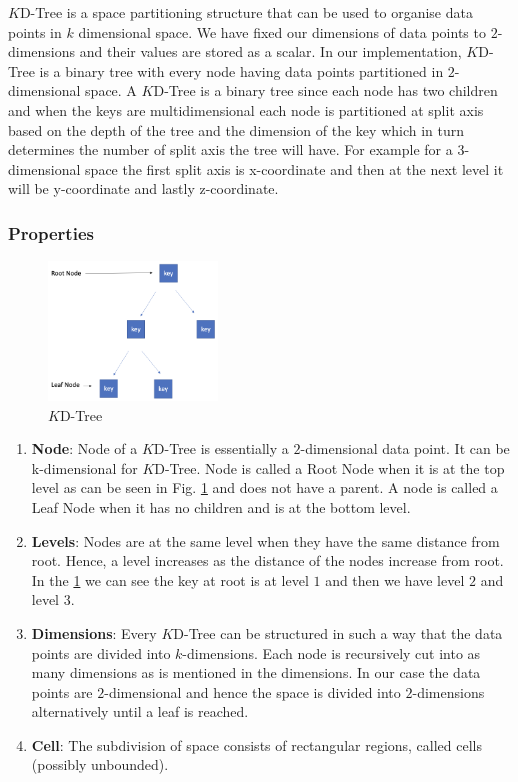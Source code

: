 $K$D-Tree is a space partitioning structure that can be used to organise data points in $k$ dimensional space. We have fixed our dimensions of data points to $2$-dimensions and their values are stored as a scalar. In our implementation, $K$D-Tree is a binary tree with every node having data points partitioned in $2$-dimensional space. A $K$D-Tree is a binary tree since each node has two children and when the keys are multidimensional each node is partitioned at split axis based on the depth of the tree and the dimension of the key which in turn determines the number of split axis the tree will have. For example for a $3$-dimensional space the first split axis is x-coordinate and then at the next level it will be y-coordinate and lastly z-coordinate.

\subsubsection{Properties}

\begin{figure}[htp]
    \centering
    \includegraphics[width=0.4\textwidth]{graphs/KD-Tree.png}
    \caption{$K$D-Tree}
    \label{fig:$K$D-Tree}
\end{figure}

\begin{enumerate}
    \item\textbf{Node}: Node of a $K$D-Tree is essentially a $2$-dimensional data point. It can be k-dimensional for $K$D-Tree. Node is called a Root Node when it is at the top level as can be seen in Fig. \ref{fig:$K$D-Tree} and does not have a parent. A node is called a Leaf Node when it has no children and is at the bottom level. 

    \item\textbf{Levels}: Nodes are at the same level when they have the same distance from root. Hence, a level increases as the distance of the nodes increase from root. In the \ref{fig:$K$D-Tree} we can see the key at root is at level $1$ and then we have level $2$ and level $3$. 
    \item\textbf{Dimensions}: Every $K$D-Tree can be structured in such a way that the data points are divided into $k$-dimensions. Each node is recursively cut into as many dimensions as is mentioned in the dimensions. In our case the data points are $2$-dimensional and hence the space is divided into $2$-dimensions alternatively until a leaf is reached.
    \item\textbf{Cell}: The subdivision of space consists of rectangular regions, called cells (possibly unbounded).
\end{enumerate}
    
